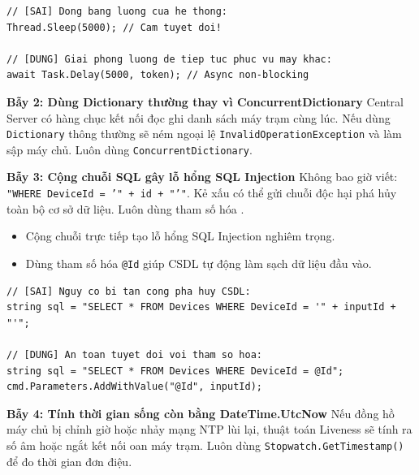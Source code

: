 \documentclass[12pt,a4paper]{article}
\begin{document}
\begin{lstlisting}[language=CSharp, caption={So sánh Bẫy 1: Thread.Sleep vs Task.Delay}]
// [SAI] Dong bang luong cua he thong:
Thread.Sleep(5000); // Cam tuyet doi!

// [DUNG] Giai phong luong de tiep tuc phuc vu may khac:
await Task.Delay(5000, token); // Async non-blocking
\end{lstlisting}

\begin{pitfallbox}
\textbf{Bẫy 2: Dùng Dictionary thường thay vì ConcurrentDictionary}
\newline Central Server có hàng chục kết nối đọc ghi danh sách máy trạm cùng lúc. Nếu dùng \texttt{Dictionary} thông thường sẽ ném ngoại lệ \texttt{InvalidOperationException} và làm sập máy chủ. Luôn dùng \texttt{Concurrent\allowbreak{}Dictionary}.
\end{pitfallbox}

\begin{pitfallbox}
\textbf{Bẫy 3: Cộng chuỗi SQL gây lỗ hổng SQL Injection}
\newline Không bao giờ viết: \texttt{"WHERE DeviceId = '" + id + "'"}. Kẻ xấu có thể gửi chuỗi độc hại phá hủy toàn bộ cơ sở dữ liệu. Luôn dùng tham số hóa .
\end{pitfallbox}

\begin{orientationbox}
\begin{itemize}[leftmargin=1.5em, itemsep=1pt]
  \item Cộng chuỗi trực tiếp tạo lỗ hổng SQL Injection nghiêm trọng.
  \item Dùng tham số hóa \texttt{@Id} giúp CSDL tự động làm sạch dữ liệu đầu vào.
\end{itemize}
\end{orientationbox}

\begin{lstlisting}[language=CSharp, caption={So sánh Bẫy 3: Cộng chuỗi SQL vs Parameterized Query}]
// [SAI] Nguy co bi tan cong pha huy CSDL:
string sql = "SELECT * FROM Devices WHERE DeviceId = '" + inputId + "'";

// [DUNG] An toan tuyet doi voi tham so hoa:
string sql = "SELECT * FROM Devices WHERE DeviceId = @Id";
cmd.Parameters.AddWithValue("@Id", inputId);
\end{lstlisting}

\begin{pitfallbox}
\textbf{Bẫy 4: Tính thời gian sống còn bằng DateTime.UtcNow}
\newline Nếu đồng hồ máy chủ bị chỉnh giờ hoặc nhảy mạng NTP lùi lại, thuật toán Liveness sẽ tính ra số âm hoặc ngắt kết nối oan máy trạm. Luôn dùng \texttt{Stopwatch.GetTimestamp()} để đo thời gian đơn điệu.
\end{pitfallbox}
\end{document}
